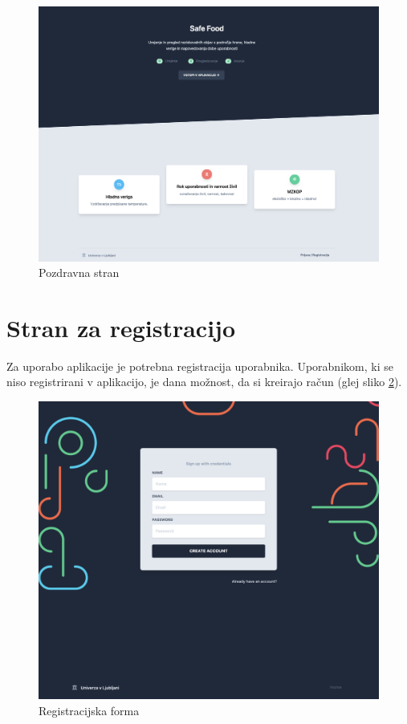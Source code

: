 \documentclass[a4paper, 12pt]{book}
\begin{document}
\begin{figure}[h]
\begin{center}
\includegraphics[width=1\textwidth]{slike/landing-page.png}
\end{center}
\caption{ Pozdravna stran }
\label{landing-page}
\end{figure}


\section{Stran za registracijo}
\label{registration-page}
Za uporabo aplikacije je potrebna registracija uporabnika. Uporabnikom, ki se niso registrirani v aplikacijo, je dana možnost, da si kreirajo račun (glej sliko \ref{signup-form}).

\begin{figure}[h]
\begin{center}
\includegraphics[width=1\textwidth]{slike/signup.png}
\end{center}
\caption{ Registracijska forma }
\label{signup-form}
\end{figure}
\end{document}
